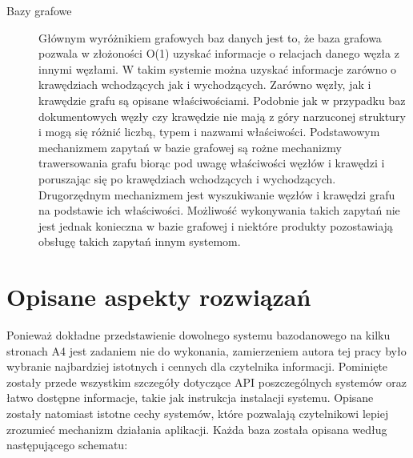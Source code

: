 \begin{description}
 \item[Bazy grafowe]
 Głównym wyróżnikiem grafowych baz danych jest to, że baza grafowa pozwala w złożoności O(1) uzyskać informacje o relacjach danego węzła z innymi węzłami.
 W takim systemie można uzyskać informacje zarówno o krawędziach wchodzących jak i wychodzących.
 Zarówno węzły, jak i krawędzie grafu są opisane właściwościami.
 Podobnie jak w przypadku baz dokumentowych węzły czy krawędzie nie mają z góry narzuconej struktury i mogą się różnić liczbą, typem i nazwami właściwości.
 Podstawowym mechanizmem zapytań w bazie grafowej są rożne mechanizmy trawersowania grafu biorąc pod uwagę właściwości węzłów i krawędzi i poruszając się po krawędziach wchodzących i wychodzących.
 Drugorzędnym mechanizmem jest wyszukiwanie węzłów i krawędzi grafu na podstawie ich właściwości.
 Możliwość wykonywania takich zapytań nie jest jednak konieczna w bazie grafowej i niektóre produkty pozostawiają obsługę takich zapytań innym systemom. 

\end{description}

\section{Opisane aspekty rozwiązań}

Ponieważ dokładne przedstawienie dowolnego systemu bazodanowego na kilku stronach A4 jest zadaniem nie do wykonania, zamierzeniem autora tej pracy było wybranie najbardziej istotnych i cennych dla czytelnika informacji.
Pominięte zostały przede wszystkim szczegóły dotyczące API poszczególnych systemów oraz łatwo dostępne informacje, takie jak instrukcja instalacji systemu.
Opisane zostały natomiast istotne cechy systemów, które pozwalają czytelnikowi lepiej zrozumieć mechanizm działania aplikacji.
Każda baza została opisana według następującego schematu:

